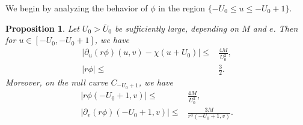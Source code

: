 \documentclass[12 pt, reqno]{amsart}
\newtheorem{proposition}[theorem]{Proposition}
\theoremstyle{definition}
\theoremstyle{remark}
\numberwithin{equation}{section}
\newcommand{\abs}[1]{\vert#1\vert}
\newcommand{\set}[1]{\{#1\}}
\newcommand{\rd}{\partial}
\newcommand{\0}{\emptyset}
\newcommand{\Ufree}{U_{0}}
\newcommand{\Ufixed}{\overline{U}_{0}}
\begin{document}
We begin by analyzing the behavior of $\phi$ in the region $\set{-\Ufree \leq u \leq -\Ufree+1}$.
\begin{proposition} \label{prop:pert:-U}
Let $\Ufree > \Ufixed$ be sufficiently large, depending on $M$ and $e$. Then for $u \in [-\Ufree, -\Ufree+1]$, we have
\begin{align}
	\abs{\rd_{u} (r \phi)(u, v) - \chi(u + \Ufree)} \leq& \frac{4M}{\Ufree^{2}}, \label{eq:pert:-U:durphi}\\
	\abs{r \phi}\leq & \frac{3}{2}. \label{eq:pert:-U:rphi}
\end{align}
Moreover, on the null curve $C_{-\Ufree+1}$, we have
\begin{align} 
	\abs{r \phi(-\Ufree+1, v)} \leq & \frac{4M}{\Ufree^{2}}, \label{eq:pert:-U+1:rphi} \\
	\abs{\rd_{v} (r \phi)(-\Ufree+1, v)} \leq & \frac{3M}{r^{3}(-\Ufree+1, v)}. \label{eq:pert:-U+1:dvrphi}
\end{align}
\end{proposition}
\end{document}
